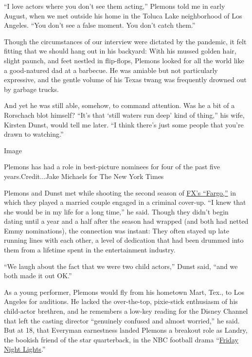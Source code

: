 ``I love actors where you don't see them acting,'' Plemons told me in
early August, when we met outside his home in the Toluca Lake
neighborhood of Los Angeles. ``You don't see a false moment. You don't
catch them.''

Though the circumstances of our interview were dictated by the pandemic,
it felt fitting that we should hang out in his backyard: With his mussed
golden hair, slight paunch, and feet nestled in flip-flops, Plemons
looked for all the world like a good-natured dad at a barbecue. He was
amiable but not particularly expressive, and the gentle volume of his
Texas twang was frequently drowned out by garbage trucks.

And yet he was still able, somehow, to command attention. Was he a bit
of a Rorschach blot himself? ``It's that `still waters run deep' kind of
thing,'' his wife, Kirsten Dunst, would tell me later. ``I think there's
just some people that you're drawn to watching.''

Image

Plemons has had a role in best-picture nominees for four of the past
five years.Credit...Jake Michaels for The New York Times

Plemons and Dunst met while shooting the second season of
\href{https://variety.com/video/kirsten-dunst-and-jesse-plemons-on-the-dramatic-twists-of-fargo-season-two/}{FX's
``Fargo,''} in which they played a married couple engaged in a criminal
cover-up. ``I knew that she would be in my life for a long time,'' he
said. Though they didn't begin dating until a year and a half after the
season had wrapped (and both had netted Emmy nominations), the
connection was instant: They often stayed up late running lines with
each other, a level of dedication that had been drummed into them from a
lifetime spent in the entertainment industry.

``We laugh about the fact that we were two child actors,'' Dunst said,
``and we both made it out OK.''

As a young performer, Plemons would fly from his hometown Mart, Tex., to
Los Angeles for auditions. He lacked the over-the-top, pixie-stick
enthusiasm of his child-actor brethren, and he remembers a low-key
reading for the Disney Channel that left the casting director
``genuinely confused and almost worried,'' he said. But at 18, that
Everyman earnestness landed Plemons a breakout role as Landry, the
bookish friend of the star quarterback, in the NBC football drama
``\href{https://www.youtube.com/watch?v=pZQJ5CQyycY}{Friday Night
Lights}.''

